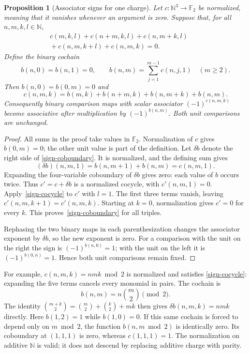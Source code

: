 \documentclass[11pt]{article}
\newtheorem{proposition}[theorem]{Proposition}
\begin{document}
\begin{proposition}[Associator signs for one charge]
\label{one-charge-associator}
Let $c:\mathbb N^3\to\mathbb F_2$ be normalized, meaning that it vanishes
whenever an argument is zero. Suppose that, for all $n,m,k,l\in\mathbb N$,
\begin{equation}
 \begin{split}
 c(m,k,l)+c(n+m,k,l)+c(n,m+k,l)\hspace{2em}\\
 {}+c(n,m,k+l)+c(n,m,k)=0.
 \end{split}\label{sign-cocycle}
\end{equation}
Define the binary cochain
\[
 b(n,0)=b(n,1)=0,\qquad
 b(n,m)=\sum_{j=1}^{m-1}c(n,j,1)\quad(m\geq2).
\]
Then $b(n,0)=b(0,m)=0$ and
\begin{equation}
 c(n,m,k)=b(m,k)+b(n+m,k)+b(n,m+k)+b(n,m).
 \label{sign-coboundary}
\end{equation}
Consequently binary comparison maps with scalar associator
$(-1)^{c(n,m,k)}$ become associative after multiplication by
$(-1)^{b(n,m)}$. Both unit comparisons are unchanged.
\end{proposition}

\begin{proof}
All sums in the proof take values in $\mathbb F_2$.
Normalization of $c$ gives $b(0,m)=0$; the other unit value is part of
the definition. Let $\delta b$ denote the right side of
\eqref{sign-coboundary}. It is normalized, and the defining sum gives
\[
 (\delta b)(n,m,1)=b(n,m+1)+b(n,m)=c(n,m,1).
\]
Expanding the four-variable coboundary of $\delta b$ gives zero:
each value of $b$ occurs twice. Thus $c'=c+\delta b$ is a normalized
cocycle, with $c'(n,m,1)=0$.
Apply~\eqref{sign-cocycle} to $c'$ with $l=1$. The first three terms
vanish, leaving $c'(n,m,k+1)=c'(n,m,k)$.
Starting at $k=0$, normalization gives $c'=0$ for every $k$.
This proves~\eqref{sign-coboundary} for all triples.

Rephasing the two binary maps in each parenthesization changes the
associator exponent by $\delta b$, so the new exponent is zero.
For a comparison with the unit on the right the sign is
$(-1)^{b(n,0)}=1$; with the unit on the left it is
$(-1)^{b(0,n)}=1$. Hence both unit comparisons remain fixed.
\end{proof}

For example, $c(n,m,k)=nmk\bmod2$ is normalized and satisfies
\eqref{sign-cocycle}: expanding the five terms cancels every monomial
in pairs. The cochain is
\[
 b(n,m)=n\binom m2\pmod2.
\]
The identity
$\binom{m+k}{2}=\binom m2+\binom k2+mk$
then gives $\delta b(n,m,k)=nmk$ directly.
Here $b(1,2)=1$ while $b(1,0)=0$.
If this same cochain is forced to depend only on $m\bmod2$, the function
$b(n,m\bmod2)$ is identically zero. Its coboundary at $(1,1,1)$ is zero,
whereas $c(1,1,1)=1$. The normalization on additive $\mathbb N$ is valid;
it does not descend by replacing additive charge with parity.
\end{document}
